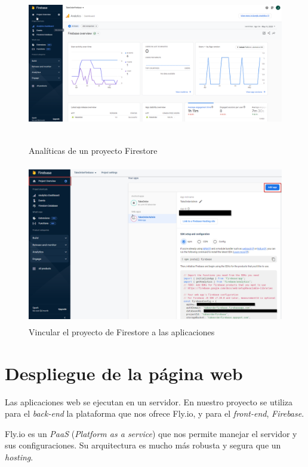 \begin{figure}[h]
    \centering
    \includegraphics[width=13cm, height=7cm]{Imagenes/Figuras/analyticsFirestore} 
   \caption{Analíticas de un proyecto Firestore\label{fig:Analytics}}
\end{figure}

\begin{figure}[h]
    \centering
    \includegraphics[width=13cm, height=7cm]{Imagenes/Figuras/addAppFirestore.png} 
   \caption{Vincular el proyecto de Firestore a las aplicaciones\label{fig:AddApp}}
\end{figure}

\section{Despliegue de la página web}


Las aplicaciones web se ejecutan en un servidor. En nuestro proyecto se utiliza para el \textit{back-end} la plataforma que nos ofrece Fly.io, y para el \textit{front-end}, \textit{Firebase}.

Fly.io es un \textit{PaaS} (\textit{Platform as a service}) que nos permite manejar el servidor y sus configuraciones. Su
arquitectura es mucho más robusta y segura que un \textit{hosting}.

